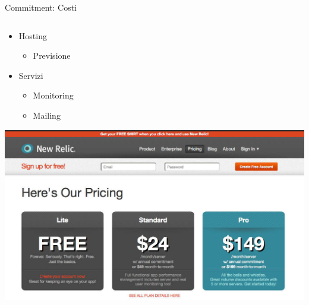 	\begin{frame}{Commitment: Costi}
		
		\begin{columns}[T]
		    \begin{column}{.5\textwidth}
			
				\begin{itemize}
					\item Hosting
						\begin{itemize}
							\item Previsione
						\end{itemize}
					\item Servizi
					\begin{itemize}
						\item Monitoring
						\item Mailing
					\end{itemize}
				\end{itemize}
				
				\vspace*{0.5cm}
				\hspace*{0.5cm} \includegraphics[scale=0.14]{images/costs-3}
    		\end{column}


\end{columns}
\end{frame}
